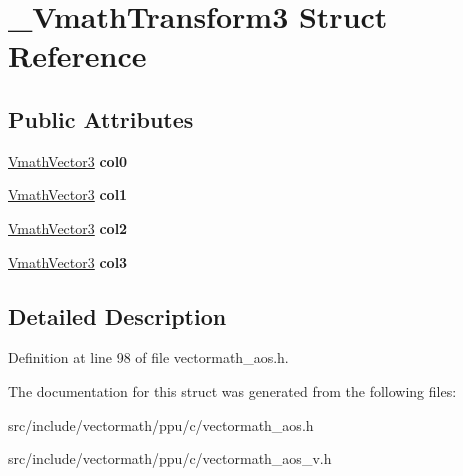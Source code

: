 \hypertarget{struct__VmathTransform3}{\section{\-\_\-\-Vmath\-Transform3 Struct Reference}
\label{struct__VmathTransform3}
}
\subsection*{Public Attributes}
\begin{DoxyCompactItemize}
\item 
\hypertarget{struct__VmathTransform3_aab2388ec1b5c7a885b114ff98a533f08}{\hyperlink{struct__VmathVector3}{Vmath\-Vector3} {\bfseries col0}}\label{struct__VmathTransform3_aab2388ec1b5c7a885b114ff98a533f08}

\item 
\hypertarget{struct__VmathTransform3_a8af681279d6982b5dc5da4058b949221}{\hyperlink{struct__VmathVector3}{Vmath\-Vector3} {\bfseries col1}}\label{struct__VmathTransform3_a8af681279d6982b5dc5da4058b949221}

\item 
\hypertarget{struct__VmathTransform3_addf9e7433ed82e21fb7358b6662640f5}{\hyperlink{struct__VmathVector3}{Vmath\-Vector3} {\bfseries col2}}\label{struct__VmathTransform3_addf9e7433ed82e21fb7358b6662640f5}

\item 
\hypertarget{struct__VmathTransform3_ad92974b79c3767a9c1f1f47415cc6610}{\hyperlink{struct__VmathVector3}{Vmath\-Vector3} {\bfseries col3}}\label{struct__VmathTransform3_ad92974b79c3767a9c1f1f47415cc6610}

\end{DoxyCompactItemize}


\subsection{Detailed Description}


Definition at line 98 of file vectormath\-\_\-aos.\-h.



The documentation for this struct was generated from the following files\-:\begin{DoxyCompactItemize}
\item 
src/include/vectormath/ppu/c/vectormath\-\_\-aos.\-h\item 
src/include/vectormath/ppu/c/vectormath\-\_\-aos\-\_\-v.\-h\end{DoxyCompactItemize}
